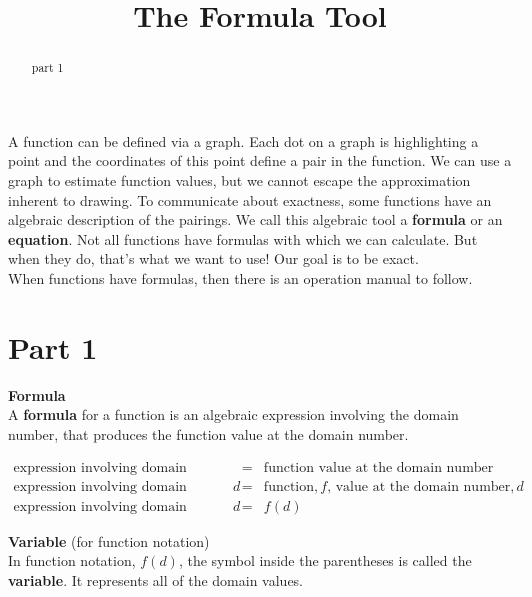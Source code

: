 \documentclass{ximera}
\title{The Formula Tool}
\begin{document}
\begin{abstract}
part 1
\end{abstract}
\maketitle



A function can be defined via a graph. Each dot on a graph is highlighting a point and the coordinates of this point define a pair in the function. We can use a graph to estimate function values, but we cannot escape the approximation inherent to drawing.  To communicate about exactness, some functions have an algebraic description of the pairings.  We call this algebraic tool a \textbf{formula} or an \textbf{equation}. Not all functions have formulas with which we can calculate.  But when they do, that's what we want to use!  Our goal is to be exact. \\


When functions have formulas, then there is an operation manual to follow. \\



\section*{Part 1}

\begin{definition}  \textbf{\textcolor{green!50!black}{Formula}} \\ 

A \textbf{formula} for a function is an algebraic expression involving the domain number, that produces the function value at the domain number.
\end{definition}



\[
\begin{array}{rcl}
     \text{expression involving domain number} & = &  \text{function value at the domain number}  \\ 
      \text{expression involving domain number,} \, d  & = &  \text{function,} \, f \text{, value at the domain number,} \, d \\ 
      \text{expression involving domain number,} \, d & = & f(d) 
\end{array}
\]







\begin{definition}  \textbf{\textcolor{green!50!black}{Variable}} (for function notation) \\ 


In function notation, $f(d)$, the symbol inside the parentheses is called the \textbf{variable}. It represents all of the domain values.
\end{definition}
\end{document}
